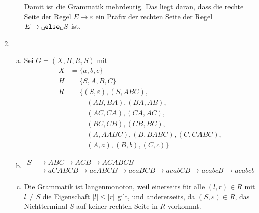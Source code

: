 \begin{enumerate}[1.]
\begin{enumerate}
\begin{center}
      \end{center}
      Damit ist die Grammatik mehrdeutig. Das liegt daran, dass die rechte Seite
      der Regel $E \rightarrow \varepsilon$ ein Präfix der rechten Seite der
      Regel $E \rightarrow \texttt{\textvisiblespace{}else\textvisiblespace{}}S$
      ist.
  \end{enumerate}

  \pagebreak

  \item
    \begin{enumerate}[(a)]
      \item Sei $G = (X,H,R,S)$ mit
        \begin{align*}
          X & = \{a, b, c\}\\
          H & = \{S, A, B, C\}\\
          R & = \{
            (S, \varepsilon), (S, ABC),\\
            & \phantom{=}\quad (AB, BA), (BA, AB),\\
            & \phantom{=}\quad (AC, CA), (CA, AC),\\
            & \phantom{=}\quad (BC, CB), (CB, BC),\\
            & \phantom{=}\quad (A, AABC), (B, BABC), (C, CABC),\\
            & \phantom{=}\quad (A, a), (B, b), (C, c)\}
        \end{align*}

      \item
        \begin{align*}
          S & \rightarrow ABC \rightarrow ACB \rightarrow ACABCB\\
          & \rightarrow aCABCB \rightarrow acABCB \rightarrow acaBCB
            \rightarrow acabCB \rightarrow acabcB \rightarrow acabcb
        \end{align*}

      \item Die Grammatik ist längenmonoton, weil einerseits für alle
        $(l, r) \in R$ mit $l \neq S$ die Eigenschaft $|l| \leq |r|$
        gilt, und andererseits, da $(S, \varepsilon) \in R$, das
        Nichtterminal $S$ auf keiner rechten Seite in $R$ vorkommt.
    \end{enumerate}
\end{enumerate}
